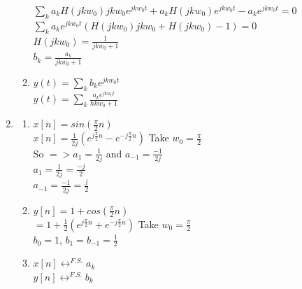\documentclass[10pt,a4paper, margin=1in]{article}
\begin{document}
\begin{enumerate}
\begin{enumerate}
    $\sum_{k} a_k H(jkw_0)jkw_0 e^{jkw_0 t} + a_k H(jkw_0) e^{jkw_0 t} - a_k e^{jkw_0 t} = 0$\\

    $\sum_{k} a_k e^{jkw_0 t}(H(jkw_0) jkw_0 + H(jkw_0) - 1) = 0$ \\

    $H(jkw_0) = \frac{1}{jkw_0 + 1}$ \\

    $b_k = \frac{a_k}{jkw_0 + 1}$ \\
    \item %
    $y(t) = \sum_kb_ke^{jkw_0 t}$ \\
    
    $y(t) = \sum_k \frac{a_k e^{jkw_0 t}}{hkw_ 0 + 1}$
        
    \end{enumerate}

\item %
    \begin{enumerate}
    \item %
    $x[n] = sin(\frac{\pi}{2}n)$ \\
    
    $x[n] = \frac{1}{2j}(e^{j\frac{\pi}{2}n} - e^{-j\frac{\pi}{2}n})$ Take $w_0 = \frac{\pi}{2}$ \\

    So $=> a_1 = \frac{1}{2j} $ and $a_{-1} = \frac{-1}{2j}$ \\

    $a_1 = \frac{1}{2j} = \frac{-j}{2}$ \\

    $a_{-1} = \frac{-1}{2j} = \frac{j}{2}$ \\

    \item %
    $y[n] = 1 + cos(\frac{\pi}{2}n)$ \\

    $= 1 + \frac{1}{2}(e^{j\frac{\pi}{2}n} + e^{-j\frac{\pi}{2}n})$ Take $w_0 = \frac{\pi}{2}$ \\

    $b_0 = 1$, $b_1 = b_{-1} = \frac{1}{2}$\\

	\item %
	$x[n] \longleftrightarrow^{F.S.} a_k$ \\

    $y[n] \longleftrightarrow^{F.S.} b_k$ \\


\end{enumerate}
\end{enumerate}
\end{document}
